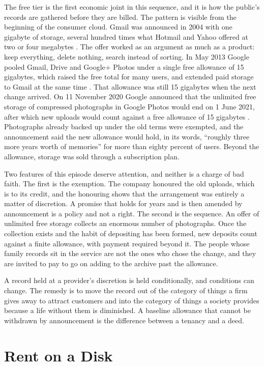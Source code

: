 \documentclass[12pt]{article}
\begin{document}
The free tier is the first economic joint in this sequence, and it is how the public's records are gathered before they are billed. The pattern is visible from the beginning of the consumer cloud. Gmail was announced in 2004 with one gigabyte of storage, several hundred times what Hotmail and Yahoo offered at two or four megabytes \cite{sciencealert}. The offer worked as an argument as much as a product: keep everything, delete nothing, search instead of sorting. In May 2013 Google pooled Gmail, Drive and Google+ Photos under a single free allowance of 15 gigabytes, which raised the free total for many users, and extended paid storage to Gmail at the same time \cite{gmailblog}. That allowance was still 15 gigabytes when the next change arrived. On 11 November 2020 Google announced that the unlimited free storage of compressed photographs in Google Photos would end on 1 June 2021, after which new uploads would count against a free allowance of 15 gigabytes \cite{googlephotos}. Photographs already backed up under the old terms were exempted, and the announcement said the new allowance would hold, in its words, ``roughly three more years worth of memories'' for more than eighty percent of users. Beyond the allowance, storage was sold through a subscription plan.

Two features of this episode deserve attention, and neither is a charge of bad faith. The first is the exemption. The company honoured the old uploads, which is to its credit, and the honouring shows that the arrangement was entirely a matter of discretion. A promise that holds for years and is then amended by announcement is a policy and not a right. The second is the sequence. An offer of unlimited free storage collects an enormous number of photographs. Once the collection exists and the habit of depositing has been formed, new deposits count against a finite allowance, with payment required beyond it. The people whose family records sit in the service are not the ones who chose the change, and they are invited to pay to go on adding to the archive past the allowance.

A record held at a provider's discretion is held conditionally, and conditions can change. The remedy is to move the record out of the category of things a firm gives away to attract customers and into the category of things a society provides because a life without them is diminished. A baseline allowance that cannot be withdrawn by announcement is the difference between a tenancy and a deed.

\section{Rent on a Disk}\label{sec:rent}
\end{document}
